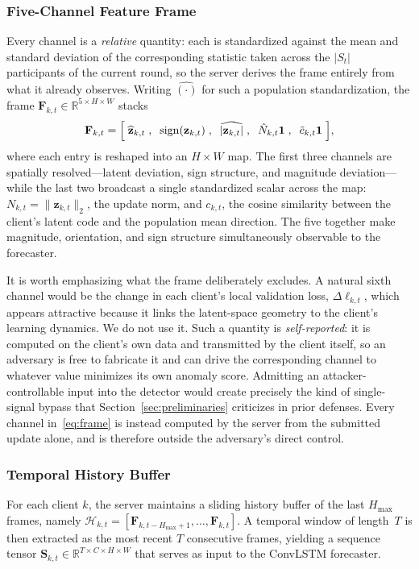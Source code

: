 \documentclass[journal]{IEEEtran}
\begin{document}
\subsubsection{Five-Channel Feature Frame}
Every channel is a \emph{relative} quantity: each is standardized against the mean and standard deviation of the corresponding statistic taken across the $|S_t|$ participants of the current round, so the server derives the frame entirely from what it already observes. Writing $\hat{(\cdot)}$ for such a population standardization, the frame $\mathbf{F}_{k,t} \in \mathbb{R}^{5 \times H \times W}$ stacks
\begin{equation}
\mathbf{F}_{k,t} = \Bigl[\;\widehat{\mathbf{z}}_{k,t}\;,\;\; \mathrm{sign}(\mathbf{z}_{k,t})\;,\;\; \widehat{|\mathbf{z}_{k,t}|}\;,\;\; \hat{N}_{k,t}\mathbf{1}\;,\;\; \hat{c}_{k,t}\mathbf{1}\;\Bigr],
\label{eq:frame}
\end{equation}
where each entry is reshaped into an $H \times W$ map. The first three channels are spatially resolved---latent deviation, sign structure, and magnitude deviation---while the last two broadcast a single standardized scalar across the map: $N_{k,t} = \|\mathbf{z}_{k,t}\|_2$, the update norm, and $c_{k,t}$, the cosine similarity between the client's latent code and the population mean direction. The five together make magnitude, orientation, and sign structure simultaneously observable to the forecaster.

It is worth emphasizing what the frame deliberately excludes. A natural sixth channel would be the change in each client's local validation loss, $\Delta\ell_{k,t}$, which appears attractive because it links the latent-space geometry to the client's learning dynamics. We do not use it. Such a quantity is \emph{self-reported}: it is computed on the client's own data and transmitted by the client itself, so an adversary is free to fabricate it and can drive the corresponding channel to whatever value minimizes its own anomaly score. Admitting an attacker-controllable input into the detector would create precisely the kind of single-signal bypass that Section~\ref{sec:preliminaries} criticizes in prior defenses. Every channel in~\eqref{eq:frame} is instead computed by the server from the submitted update alone, and is therefore outside the adversary's direct control.

\subsubsection{Temporal History Buffer}
For each client $k$, the server maintains a sliding history buffer of the last $H_{\max}$ frames, namely $\mathcal{H}_{k,t} = [\mathbf{F}_{k,t-H_{\max}+1}, \ldots, \mathbf{F}_{k,t}]$. A temporal window of length~$T$ is then extracted as the most recent $T$ consecutive frames, yielding a sequence tensor $\mathbf{S}_{k,t} \in \mathbb{R}^{T \times C \times H \times W}$ that serves as input to the ConvLSTM forecaster.
\end{document}
